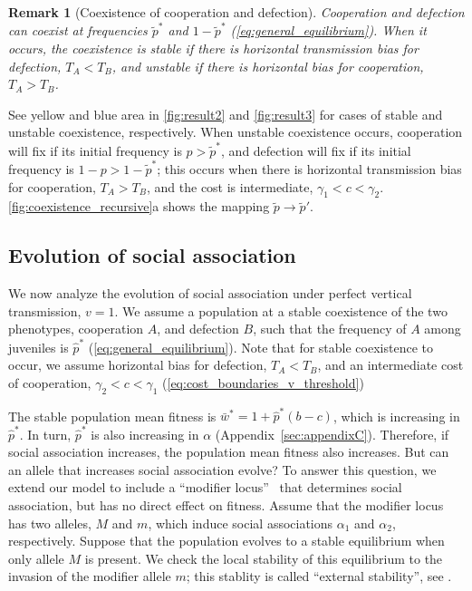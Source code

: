 \documentclass[12pt]{extarticle}
\newtheorem{remark}{Remark}
\begin{document}
\begin{remark}[Coexistence of cooperation and defection]
Cooperation and defection can coexist at frequencies $\tilde{p}^*$ and $1-\tilde{p}^*$ (\autoref{eq:general_equilibrium}). 
When it occurs, the coexistence is stable if there is horizontal transmission bias for defection, $T_A<T_B$, and unstable if there is horizontal bias for cooperation, $T_A>T_B$.
\end{remark}

See yellow and blue area in \autoref{fig:result2} and \autoref{fig:result3} for cases of stable and unstable coexistence, respectively.
When unstable coexistence occurs, cooperation will fix if its initial frequency is $p>\tilde{p}^*$, and defection will fix if its initial frequency is $1-p>1-\tilde{p}^*$; this occurs when there is horizontal transmission bias for cooperation, $T_A>T_B$, and the cost is intermediate, $\gamma_1 < c < \gamma_2$.
\autoref{fig:coexistence_recursive}a shows the mapping $\tilde p \to \tilde p'$.


\subsection*{Evolution of social association} 

We now analyze the evolution of social association under perfect vertical transmission, $v=1$. 
We assume a population at a stable coexistence of the two phenotypes, cooperation $A$, and defection $B$, such that the frequency of $A$ among juveniles is $\hat{p}^*$ (\autoref{eq:general_equilibrium}).
Note that for stable coexistence to occur, we assume horizontal bias for defection, $T_A < T_B$, and an intermediate cost of cooperation, $\gamma_2 < c < \gamma_1$ (\autoref{eq:cost_boundaries_v_threshold})

The stable population mean fitness is $\bar{w}^* = 1 + \hat{p}^*(b-c)$, which is increasing in $\hat{p}^*$. 
In turn, $\hat{p}^*$ is also increasing in $\alpha$ (Appendix~\ref{sec:appendixC}).
Therefore, if social association increases, the population mean fitness also increases.
But can an allele that increases social association evolve? 
To answer this question, we extend our model to include a ``modifier locus''~\citep{Liberman1986,Liberman1988} that determines social association, but has no direct effect on fitness.
Assume that the modifier locus has two alleles, $M$ and $m$, which induce social associations $\alpha_1$ and $\alpha_2$, respectively.
Suppose that the population evolves to a stable equilibrium when only allele $M$ is present.
We check the local stability of this equilibrium to the invasion of the modifier allele $m$; this stablity is called ``external stability'', see \citet{Altenberg2017}.
\end{document}
